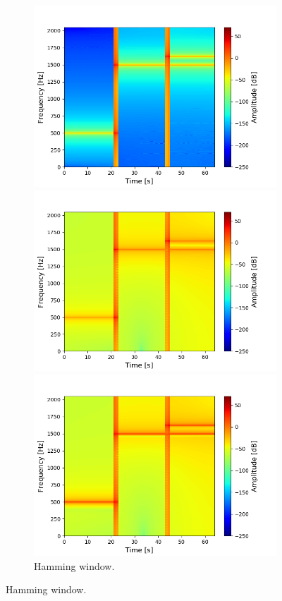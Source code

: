 \begin{figure}[H]
\centering
\begin{subfigure}{0.49\textwidth}
\centering
\includegraphics[width=\textwidth]{figures/stft_windows/hanning_10000.png}
\caption{Hann window.}
\label{fig:stft_hanning}
\includegraphics[width=\textwidth]{figures/stft_windows/hamming_10000.png}
\caption{Hamming window.}
\label{fig:stft_hamming}
\includegraphics[width=\textwidth]{figures/stft_windows/kaiser/10000/4.png}

\end{subfigure}
\end{figure}
